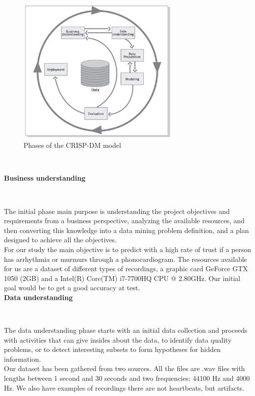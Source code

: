 \documentclass[11pt, a4papper]{report}
\theoremstyle{plain}
\theoremstyle{definition}
\theoremstyle{definition}
\theoremstyle{proposition}
\begin{document}
\begin{figure}[h]
\includegraphics[width=8cm]{crisp.png}
\centering
\caption{Phases of the CRISP-DM model}
\end{figure}
\


\textbf{Business understanding}

\

The initial phase main purpose is understanding the project objectives and requirements from a business perspective, analyzing the available resources, and then converting this knowledge into a data mining problem definition, and a plan designed to achieve all the objectives. 
\\

For our study the main objective is to predict with a high rate of trust if a person has arrhythmia or murmurs through a phonocardiogram. The resources available for us are a dataset of different types of recordings, a graphic card GeForce GTX 1050 (2GB) and a Intel(R) Core(TM) i7-7700HQ CPU @ 2.80GHz. Our initial goal would be to get a good accuracy at test.
\\

\textbf{Data understanding}

\

The data understanding phase starts with an initial data collection and proceeds with activities that can give insides about the data, to identify data quality problems, or to detect interesting subsets to form hypotheses for hidden information.
\\

Our dataset has been gathered from two sources. All the files are .wav files with lengths between 1 second and 30 seconds and two frequencies: 44100 Hz and 4000 Hz. We also have examples of recordings there are not heartbeats, but artifacts.
\\
\end{document}
